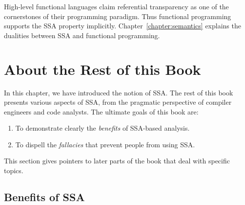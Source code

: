 High-level functional languages claim
referential transparency as one of the
cornerstones of their programming paradigm.
Thus functional programming supports the SSA property
implicitly.
Chapter~\ref{chapter:semantics} explains the 
dualities between SSA and functional programming.





\section{About the Rest of this Book}

In this chapter, we have introduced the notion of SSA.
The rest of this book presents various aspects of SSA,
from the pragmatic perspective of compiler engineers and
code analysts. The ultimate goals of this book are:
\begin{enumerate}
\item To demonstrate clearly the \emph{benefits} of SSA-based analysis.
\item To dispell the \emph{fallacies} that prevent people from using SSA.
\end{enumerate}
This section gives pointers to later parts of the book that deal with
specific topics.


\subsection{Benefits of SSA}


